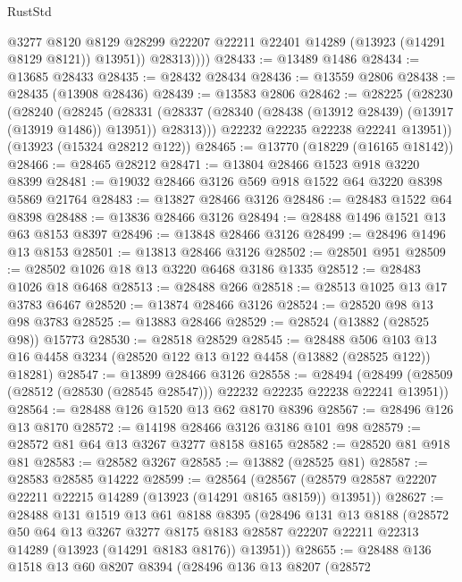\begin{lexlean}{RustStd}
\begin{coremodule}
                @3277
                @8120
                @8129
                @28299
                @22207
                @22211
                @22401
                @14289
                (@13923 (@14291 @8129 @8121))
                @13951))
            @28313))))
@28433 := @13489 @1486
@28434 := @13685 @28433
@28435 := @28432 @28434
@28436 := @13559 @2806
@28438 := @28435 (@13908 @28436)
@28439 := @13583 @2806
@28462 := @28225
    (@28230
      (@28240
        (@28245
          (@28331 (@28337 (@28340 (@28438 (@13912 @28439) (@13917 (@13919 @1486)) @13951)) @28313)))
        @22232
        @22235
        @22238
        @22241
        @13951))
    (@13923 (@15324 @28212 @122))
@28465 := @13770 (@18229 (@16165 @18142))
@28466 := @28465 @28212
@28471 := @13804 @28466 @1523 @918 @3220 @8399
@28481 := @19032 @28466 @3126 @569 @918 @1522 @64 @3220 @8398 @5869 @21764
@28483 := @13827 @28466 @3126
@28486 := @28483 @1522 @64 @8398
@28488 := @13836 @28466 @3126
@28494 := @28488 @1496 @1521 @13 @63 @8153 @8397
@28496 := @13848 @28466 @3126
@28499 := @28496 @1496 @13 @8153
@28501 := @13813 @28466 @3126
@28502 := @28501 @951
@28509 := @28502 @1026 @18 @13 @3220 @6468 @3186 @1335
@28512 := @28483 @1026 @18 @6468
@28513 := @28488 @266
@28518 := @28513 @1025 @13 @17 @3783 @6467
@28520 := @13874 @28466 @3126
@28524 := @28520 @98 @13 @98 @3783
@28525 := @13883 @28466
@28529 := @28524 (@13882 (@28525 @98)) @15773
@28530 := @28518 @28529
@28545 := @28488
    @506
    @103
    @13
    @16
    @4458
    @3234
    (@28520 @122 @13 @122 @4458 (@13882 (@28525 @122)) @18281)
@28547 := @13899 @28466 @3126
@28558 := @28494
    (@28499 (@28509 (@28512 (@28530 (@28545 @28547))) @22232 @22235 @22238 @22241 @13951))
@28564 := @28488 @126 @1520 @13 @62 @8170 @8396
@28567 := @28496 @126 @13 @8170
@28572 := @14198 @28466 @3126 @3186 @101 @98
@28579 := @28572 @81 @64 @13 @3267 @3277 @8158 @8165
@28582 := @28520 @81 @918 @81
@28583 := @28582 @3267
@28585 := @13882 (@28525 @81)
@28587 := @28583 @28585 @14222
@28599 := @28564
    (@28567 (@28579 @28587 @22207 @22211 @22215 @14289 (@13923 (@14291 @8165 @8159)) @13951))
@28627 := @28488
    @131
    @1519
    @13
    @61
    @8188
    @8395
    (@28496
      @131
      @13
      @8188
      (@28572
        @50
        @64
        @13
        @3267
        @3277
        @8175
        @8183
        @28587
        @22207
        @22211
        @22313
        @14289
        (@13923 (@14291 @8183 @8176))
        @13951))
@28655 := @28488
    @136
    @1518
    @13
    @60
    @8207
    @8394
    (@28496
      @136
      @13
      @8207
      (@28572

\end{coremodule}
\end{lexlean}
